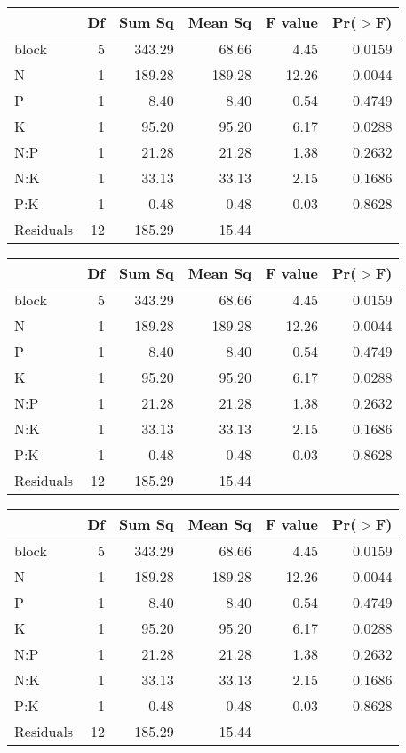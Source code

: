 \begin{table}[ht]
\centering
\begin{tabular}{lrrrrr}
  \hline
 & Df & Sum Sq & Mean Sq & F value & Pr($>$F) \\ 
  \hline
block & 5 & 343.29 & 68.66 & 4.45 & 0.0159 \\ 
  N & 1 & 189.28 & 189.28 & 12.26 & 0.0044 \\ 
  P & 1 & 8.40 & 8.40 & 0.54 & 0.4749 \\ 
  K & 1 & 95.20 & 95.20 & 6.17 & 0.0288 \\ 
  N:P & 1 & 21.28 & 21.28 & 1.38 & 0.2632 \\ 
  N:K & 1 & 33.13 & 33.13 & 2.15 & 0.1686 \\ 
  P:K & 1 & 0.48 & 0.48 & 0.03 & 0.8628 \\ 
  Residuals & 12 & 185.29 & 15.44 &  &  \\ 
   \hline
\end{tabular}
\end{table}
\begin{table}[ht]
\centering
\begin{tabular}{lrrrrr}
  \hline
 & Df & Sum Sq & Mean Sq & F value & Pr($>$F) \\ 
  \hline
block & 5 & 343.29 & 68.66 & 4.45 & 0.0159 \\ 
  N & 1 & 189.28 & 189.28 & 12.26 & 0.0044 \\ 
  P & 1 & 8.40 & 8.40 & 0.54 & 0.4749 \\ 
  K & 1 & 95.20 & 95.20 & 6.17 & 0.0288 \\ 
  N:P & 1 & 21.28 & 21.28 & 1.38 & 0.2632 \\ 
  N:K & 1 & 33.13 & 33.13 & 2.15 & 0.1686 \\ 
  P:K & 1 & 0.48 & 0.48 & 0.03 & 0.8628 \\ 
  Residuals & 12 & 185.29 & 15.44 &  &  \\ 
   \hline
\end{tabular}
\end{table}
\begin{table}[ht]
\centering
\begin{tabular}{lrrrrr}
  \hline
 & Df & Sum Sq & Mean Sq & F value & Pr($>$F) \\ 
  \hline
block       & 5 & 343.29 & 68.66 & 4.45 & 0.0159 \\ 
  N           & 1 & 189.28 & 189.28 & 12.26 & 0.0044 \\ 
  P           & 1 & 8.40 & 8.40 & 0.54 & 0.4749 \\ 
  K           & 1 & 95.20 & 95.20 & 6.17 & 0.0288 \\ 
  N:P         & 1 & 21.28 & 21.28 & 1.38 & 0.2632 \\ 
  N:K         & 1 & 33.13 & 33.13 & 2.15 & 0.1686 \\ 
  P:K         & 1 & 0.48 & 0.48 & 0.03 & 0.8628 \\ 
  Residuals   & 12 & 185.29 & 15.44 &  &  \\ 
   \hline
\end{tabular}
\end{table}
